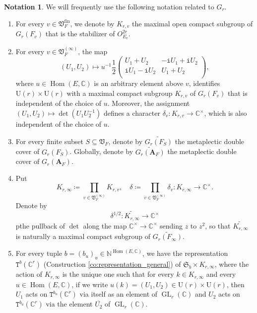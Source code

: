 \documentclass[12pt]{amsart}
\numberwithin{equation}{section}
\theoremstyle{plain}
\theoremstyle{definition}
\newtheorem{notation}[proposition]{Notation}
\theoremstyle{remark}
\renewcommand{\b}[1]{\mathbf{#1}}
\renewcommand{\d}[1]{\mathbb{#1}}
\newcommand{\f}[1]{\mathfrak{#1}}
\renewcommand{\r}[1]{\mathrm{#1}}
\renewcommand{\(}{\left(}
\renewcommand{\)}{\right)}
\newcommand{\ol}[1]{\overline{#1}{}}
\newcommand{\bA}{\b A}
\newcommand{\dC}{\d C}
\newcommand{\dN}{\d N}
\newcommand{\fS}{\f S}
\newcommand{\fV}{\f V}
\newcommand{\rU}{\r U}
\newcommand{\tT}{\mathtt{T}}
\newcommand{\ti}{\mathtt{i}}
\newcommand{\fin}{\r{fin}}
\DeclareMathOperator{\GL}{GL}
\DeclareMathOperator{\Hom}{Hom}
\begin{document}
\begin{notation}\label{no:hermitian_siegel}
We will frequently use the following notation related to $G_r$.
\begin{enumerate}
  \item For every $v\in\fV_F^\fin$, we denote by $K_{r,v}$ the maximal open compact subgroup of $G_r(F_v)$ that is the stabilizer of $O_{E_v}^{2r}$.

  \item For every $v\in\fV_F^{(\infty)}$, the map
      \[
      (U_1,U_2)\mapsto u^{-1}\frac{1}{2}
      \begin{pmatrix}
      U_1+U_2   & -\ti U_1+\ti U_2 \\
      \ti U_1-\ti U_2   & U_1+U_2 \\
      \end{pmatrix},
      \]
      where $u\in\Hom(E,\dC)$ is an arbitrary element above $v$, identifies $\rU(r)\times\rU(r)$ with a maximal compact subgroup $K_{r,v}$ of $G_r(F_v)$ that is independent of the choice of $u$. Moreover, the assignment $(U_1,U_2)\mapsto\det(U_1 U_2^{-1})$ defines a character $\delta_v\colon K_{r,v}\to\dC^\times$, which is also independent of the choice of $u$.

  \item For every finite subset $S\subseteq\fV_F$, denote by $\widetilde{G_r(F_S)}$ the metaplectic double cover of $G_r(F_S)$. Globally, denote by $\widetilde{G_r(\bA_F)}$ the metaplectic double cover of $G_r(\bA_F)$.

  \item Put
      \[
      K_{r,\infty}\coloneqq\prod_{v\in\fV_F^{(\infty)}}K_{r,v},\quad
      \delta\coloneqq\prod_{v\in\fV_F^{(\infty)}}\delta_v\colon K_{r,\infty}\to\dC^\times.
      \]
      Denote by
      \[
      \delta^{1/2}\colon\widetilde{K_{r,\infty}}\to\dC^\times
      \]
      pthe pullback of $\det$ along the map $\dC^\times\to\dC^\times$ sending $z$ to $z^2$, so that $\widetilde{K_{r,\infty}}$ is naturally a maximal compact subgroup of $\widetilde{G_r(F_\infty)}$.

  \item For every tuple $b=(b_u)_u\in\dN^{\Hom(E,\dC)}$, we have the representation $\tT^b(\dC^r)$ (Construction \ref{co:representation_general}) of $\fS_b\times K_{r,\infty}$, where the action of $K_{r,\infty}$ is the unique one such that for every $k\in K_{r,\infty}$ and every $u\in\Hom(E,\dC)$, if we write $u(k)=(U_1,U_2)\in\rU(r)\times\rU(r)$, then $U_1$ acts on $\tT^{b_u}(\dC^r)$ via itself as an element of $\GL_r(\dC)$ and $U_2$ acts on $\tT^{b_{\ol{u}}}(\dC^r)$ via the element $\ol{U_2}$ of $\GL_r(\dC)$.


\end{enumerate}
\end{notation}
\end{document}
